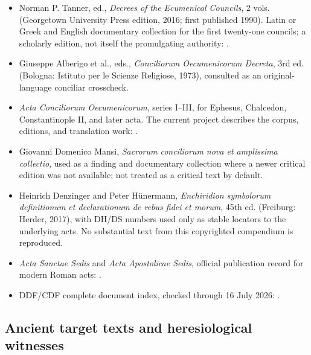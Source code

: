 \begin{itemize}
  \item Norman P. Tanner, ed., \emph{Decrees of the Ecumenical Councils}, 2 vols. (Georgetown University Press edition, 2016; first published 1990). Latin or Greek and English documentary collection for the first twenty-one councils; a scholarly edition, not itself the promulgating authority: .
  \item Giuseppe Alberigo et al., eds., \emph{Conciliorum Oecumenicorum Decreta}, 3rd ed. (Bologna: Istituto per le Scienze Religiose, 1973), consulted as an original-language conciliar crosscheck.
  \item \emph{Acta Conciliorum Oecumenicorum}, series I--III, for Ephesus, Chalcedon, Constantinople II, and later acta. The current project describes the corpus, editions, and translation work: .
  \item Giovanni Domenico Mansi, \emph{Sacrorum conciliorum nova et amplissima collectio}, used as a finding and documentary collection where a newer critical edition was not available; not treated as a critical text by default.
  \item Heinrich Denzinger and Peter H\"unermann, \emph{Enchiridion symbolorum definitionum et declarationum de rebus fidei et morum}, 45th ed. (Freiburg: Herder, 2017), with DH/DS numbers used only as stable locators to the underlying acts. No substantial text from this copyrighted compendium is reproduced.
  \item \emph{Acta Sanctae Sedis} and \emph{Acta Apostolicae Sedis}, official publication record for modern Roman acts: .
  \item DDF/CDF complete document index, checked through 16 July 2026: .
\end{itemize}

\subsection{Ancient target texts and heresiological witnesses}

